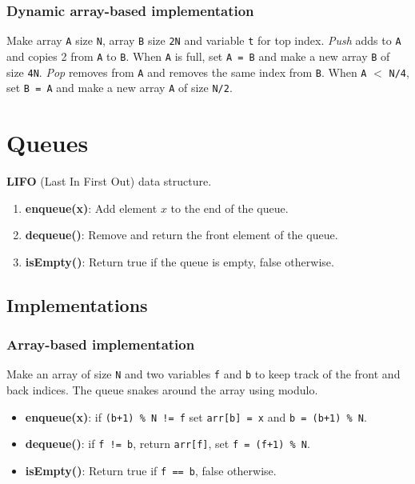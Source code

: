 
\subsubsection{Dynamic array-based implementation}
Make array \verb|A| size \verb|N|, array \verb|B| size \verb|2N| and variable \verb|t| for top index.
\emph{Push} adds to \verb|A| and copies 2 from \verb|A| to \verb|B|. When \verb|A| is full, set \verb|A = B| and make a new array \verb|B| of size \verb|4N|.
\emph{Pop} removes from \verb|A| and removes the same index from \verb|B|.
When \verb|A| $<$ \verb|N/4|, set \verb|B = A| and make a new array \verb|A| of size \verb|N/2|.


\section{Queues}
\textbf{LIFO} (Last In First Out) data structure.

\begin{enumerate}
    \item \textbf{enqueue(x)}: Add element $x$ to the end of the queue.
    \item \textbf{dequeue()}: Remove and return the front element of the queue.
    \item \textbf{isEmpty()}: Return true if the queue is empty, false otherwise.
\end{enumerate}

\subsection{Implementations}
\subsubsection{Array-based implementation}
Make an array of size \verb|N| and two variables \verb|f| and \verb|b| to keep track of the front and back indices.
The queue snakes around the array using modulo.

\begin{itemize}
    \item \textbf{enqueue(x)}: if \verb|(b+1) % N != f| set \verb|arr[b] = x| and \verb|b = (b+1) % N|.
    \item \textbf{dequeue()}: if \verb|f != b|, return \verb|arr[f]|, set \verb|f = (f+1) % N|.
    \item \textbf{isEmpty()}: Return true if \verb|f == b|, false otherwise.
\end{itemize}


